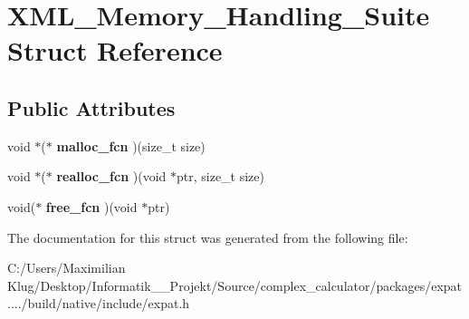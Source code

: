 \hypertarget{struct_x_m_l___memory___handling___suite}{}\section{X\+M\+L\+\_\+\+Memory\+\_\+\+Handling\+\_\+\+Suite Struct Reference}
\label{struct_x_m_l___memory___handling___suite}
\subsection*{Public Attributes}
\begin{DoxyCompactItemize}
\item 
\mbox{\label{struct_x_m_l___memory___handling___suite_a3f5c0662300b015874bbe4ee6cf42951}} 
void $\ast$($\ast$ {\bfseries malloc\+\_\+fcn} )(size\+\_\+t size)
\item 
\mbox{\label{struct_x_m_l___memory___handling___suite_a3af8aa30831e0e75332d3289f7dd2e9f}} 
void $\ast$($\ast$ {\bfseries realloc\+\_\+fcn} )(void $\ast$ptr, size\+\_\+t size)
\item 
\mbox{\label{struct_x_m_l___memory___handling___suite_aaf87eb0cabf4e57a92707d9f04d76486}} 
void($\ast$ {\bfseries free\+\_\+fcn} )(void $\ast$ptr)
\end{DoxyCompactItemize}


The documentation for this struct was generated from the following file\+:\begin{DoxyCompactItemize}
\item 
C\+:/\+Users/\+Maximilian Klug/\+Desktop/\+Informatik\+\_\+\_\+\+Projekt/\+Source/complex\+\_\+calculator/packages/expat..../build/native/include/expat.\+h\end{DoxyCompactItemize}
